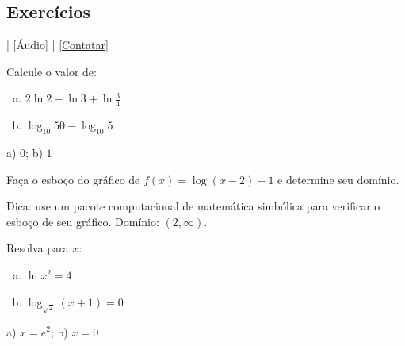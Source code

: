 \subsection*{Exercícios}

\begin{flushright}
  [Vídeo] | [Áudio] | \href{https://phkonzen.github.io/notas/contato.html}{[Contatar]}
\end{flushright}

\begin{exer}
  Calcule o valor de:
  \begin{enumerate}[a)]
  \item $2\ln 2 - \ln 3 + \ln \frac{3}{4}$
  \item $\log_{10} 50 - \log_{10} 5$
  \end{enumerate}
\end{exer}
\begin{resp}
  a) $0$; b) $1$
\end{resp}

\begin{exer}
  Faça o esboço do gráfico de $f(x) = \log(x-2)-1$ e determine seu domínio.
\end{exer}
\begin{resp}
  Dica: use um pacote computacional de matemática simbólica para verificar o esboço de seu gráfico. Domínio: $(2, \infty)$.
\end{resp}

\begin{exer}
  Resolva para $x$:
  \begin{enumerate}[a)]
  \item $\ln x^2 = 4$
  \item $\log_{\sqrt{2}} (x+1) = 0$
  \end{enumerate}
\end{exer}
\begin{resp}
  a) $x=e^2$; b) $x=0$
\end{resp}
